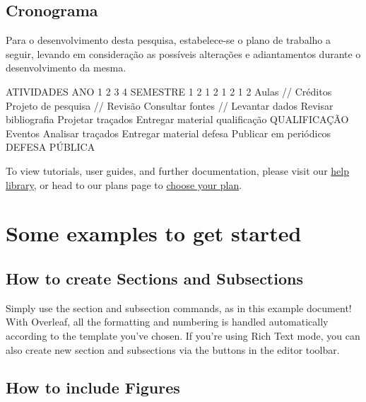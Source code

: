 \documentclass[twoside, 12pt]{book}
\begin{document}
\begin{enumerate}[label=\alph*)]
    \subsection{Cronograma}

        Para o desenvolvimento desta pesquisa, estabelece-se o plano de trabalho a seguir, levando em consideração as possíveis alterações e adiantamentos durante o desenvolvimento da mesma. 

        ATIVIDADES	ANO	1	2	3	4
	    SEMESTRE	1	2	1	2	1	2	1	2
        Aulas // Créditos	 	 	 	 	 	 	 	 
        Projeto de pesquisa // Revisão	 	 	 	 	 	 	 	 
        Consultar fontes // Levantar dados	 	 	 	 	 	 	 	 
        Revisar bibliografia	 	 	 	 	 	 	 	 
        Projetar traçados	 	 	 	 	 	 	 	 
        Entregar material qualificação	 	 	 	 	 	 	 	 
        QUALIFICAÇÃO	 	 	 	 	 	 	 	 
        Eventos	 	 	 	 	 	 	 	 
        Analisar traçados	 	 	 	 	 	 	 	 
        Entregar material defesa	 	 	 	 	 	 	 	 
        Publicar em periódicos	 	 	 	 	 	 	 	 
        DEFESA PÚBLICA	 	 	 	 	 	 	 	 

\newpage


 To view tutorials, user guides, and further documentation, please visit our \href{https://www.overleaf.com/learn}{help library}, or head to our plans page to \href{https://www.overleaf.com/user/subscription/plans}{choose your plan}.

\section{Some examples to get started}

    \subsection{How to create Sections and Subsections}

        Simply use the section and subsection commands, as in this example document! With Overleaf, all the formatting and numbering is handled automatically according to the template you've chosen. If you're using Rich Text mode, you can also create new section and subsections via the buttons in the editor toolbar.

    \subsection{How to include Figures}


\end{enumerate}
\end{document}
